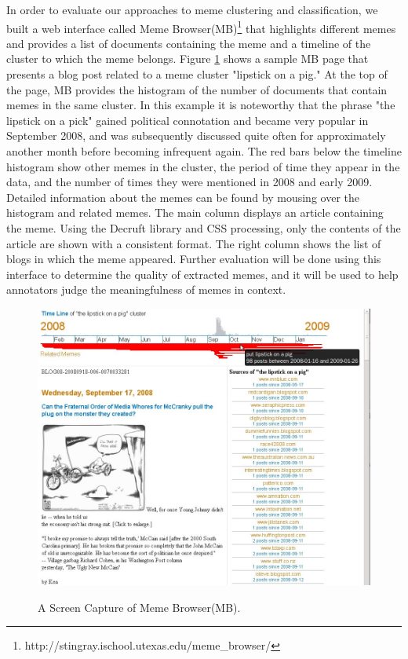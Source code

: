 \documentclass{sig-alternate}
\begin{document}
In order to evaluate our approaches to meme clustering and classification, we built a web interface called Meme Browser(MB)\footnote{http://stingray.ischool.utexas.edu/meme\_browser/} that highlights different memes and provides a list of documents containing the meme and a timeline of the cluster to which the meme belongs. Figure \ref{fig:mockup} shows a sample MB page that presents a blog post related to a meme cluster "lipstick on a pig." At the top of the page, MB provides the histogram of the number of documents that contain memes in the same cluster. In this example it is noteworthy that the phrase "the lipstick on a pick" gained political connotation and became very popular in September 2008, and was subsequently discussed quite often for approximately another month before becoming infrequent again. The red bars below the timeline histogram show other memes in the cluster, the period of time they appear in the data, and the number of times they were mentioned in 2008 and early 2009. Detailed information about the memes can be found by mousing over the histogram and related memes. The main column displays an article containing the meme. Using the Decruft library and CSS processing, only the contents of the article are shown with a consistent format. The right column shows the list of blogs in which the meme appeared. Further evaluation will be done using this interface to determine the quality of extracted memes, and it will be used to help annotators judge the meaningfulness of memes in context.
\begin{figure}[htb]
	\begin{center}
		{\includegraphics[width=\textwidth]{mockup.jpg}}
	\end{center}
	\caption{A Screen Capture of Meme Browser(MB).}
	\label{fig:mockup}
\end{figure}
\end{document}
